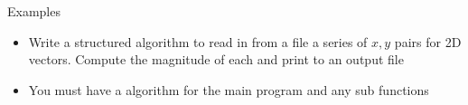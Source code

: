 \documentclass[11pt,professionalfonts]{beamer}
\begin{document}
\begin{frame}{Examples}
    \begin{itemize}
        \item Write a structured algorithm to read in from a file a series of \(x, y\) pairs for 2D vectors.
            Compute the magnitude of each and print to an output file
        \item You must have a algorithm for the main program and any sub functions
    \end{itemize}
\end{frame}
\end{document}
